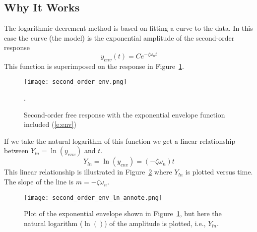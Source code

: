 
\subsection*{Why It Works}
The logarithmic decrement method is based on fitting a curve to the data.  In this case the curve (the model) is the exponential amplitude of the second-order response
\begin{equation}
y_{env}(t)=C e^{-\zeta\omega_nt}
\label{e:env}
\end{equation}
This function is superimposed on the response in Figure~\ref{f:env}.
\begin{figure}[h!bt]
\centerline{
{\texttt{[image: second\_order\_env.png]}}}
\caption{Second-order free response with the exponential envelope function included (\ref{e:env})}.
\label{f:env}
\end{figure}

If we take the natural logarithm of this function we get a linear relationship between $Y_{ln}=\ln(y_{env})$ and $t$.
\[
Y_{ln}=\ln(y_{env})=(-\zeta \omega_n) t
\]
This linear relationship is illustrated in Figure~\ref{f:ln} where $Y_{ln}$ is plotted versus time.  The slope of the line is $m=-\zeta \omega_n$.
\begin{figure}[hbt!]
\centerline{
{\texttt{[image: second\_order\_env\_ln\_annote.png]}}}
\caption{Plot of the exponential envelope shown in Figure~\ref{f:env}, but here the natural logarithm ($\ln()$) of the amplitude is plotted, i.e., $Y_{ln}$.}
\label{f:ln}
\end{figure}

